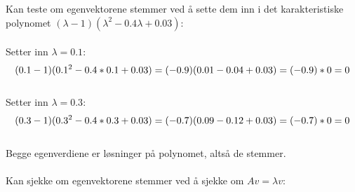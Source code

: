 \newpage
Kan teste om egenvektorene stemmer ved å sette dem inn i det karakteristiske polynomet $(\lambda -1)(\lambda^2-0.4\lambda + 0.03)$:
\\\\ Setter inn $\lambda = 0.1$:
\begin{equation}\nonumber
(0.1 -1)(0.1^2-0.4*0.1 + 0.03) \\ = (-0.9)(0.01-0.04 + 0.03) \\ = (-0.9)*0 = 0 
\end{equation}
\\ Setter inn $\lambda = 0.3$:
\begin{equation}\nonumber
(0.3 -1)(0.3^2-0.4*0.3 + 0.03) \\ = (-0.7)(0.09-0.12 + 0.03) \\ = (-0.7)*0 = 0 
\end{equation}
\\ Begge egenverdiene er løsninger på polynomet, altså de stemmer. 
\\ \\ Kan sjekke om egenvektorene stemmer ved å sjekke om $Av = \lambda v$:
\vspace{0.1in}


